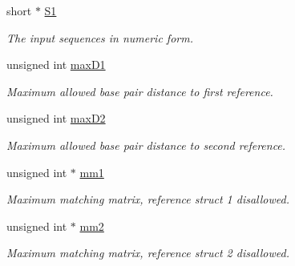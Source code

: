 \begin{DoxyCompactItemize}
short $\ast$ \hyperlink{group__kl__neighborhood__mfe_ab9ee459ffbfb5d2c138a033516056cdc}{S1}
\begin{DoxyCompactList}\small\item\em The input sequences in numeric form. \end{DoxyCompactList}\item 
\mbox{\label{group__kl__neighborhood__mfe_a621ed2ab02116f3f8f5e7120dec429eb}} 
unsigned int \hyperlink{group__kl__neighborhood__mfe_a621ed2ab02116f3f8f5e7120dec429eb}{max\+D1}
\begin{DoxyCompactList}\small\item\em Maximum allowed base pair distance to first reference. \end{DoxyCompactList}\item 
\mbox{\label{group__kl__neighborhood__mfe_a03f198a4abdb3b784486d2ba5c533aa4}} 
unsigned int \hyperlink{group__kl__neighborhood__mfe_a03f198a4abdb3b784486d2ba5c533aa4}{max\+D2}
\begin{DoxyCompactList}\small\item\em Maximum allowed base pair distance to second reference. \end{DoxyCompactList}\item 
\mbox{\label{group__kl__neighborhood__mfe_aa11f5bcd8c4fe70a91c155c877c855d5}} 
unsigned int $\ast$ \hyperlink{group__kl__neighborhood__mfe_aa11f5bcd8c4fe70a91c155c877c855d5}{mm1}
\begin{DoxyCompactList}\small\item\em Maximum matching matrix, reference struct 1 disallowed. \end{DoxyCompactList}\item 
\mbox{\label{group__kl__neighborhood__mfe_a2eaa93316b6beb17531f0c078806036c}} 
unsigned int $\ast$ \hyperlink{group__kl__neighborhood__mfe_a2eaa93316b6beb17531f0c078806036c}{mm2}
\begin{DoxyCompactList}\small\item\em Maximum matching matrix, reference struct 2 disallowed. \end{DoxyCompactList}\item 
\mbox{\label{group__kl__neighborhood__mfe_a1a20cb06b58b75d1a3dbdbc8bc60d0a7}} 

\end{DoxyCompactItemize}
